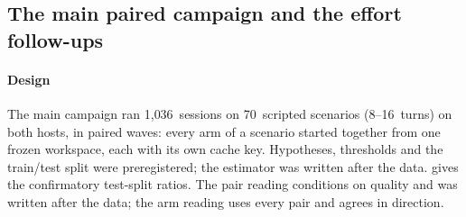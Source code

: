 \documentclass[11pt,letterpaper]{article}
\newcommand{\MaxTurns}{16}
\newcommand{\MinTurns}{8}
\newcommand{\NScenarios}{70}
\newcommand{\NSessions}{1{,}036}
\begin{document}
\subsection{The main paired campaign and the effort follow-ups}\label{sec:campaign}

\paragraph{Design} The main campaign ran \NSessions\ sessions on \NScenarios\ scripted scenarios (\MinTurns--\MaxTurns\
turns) on both hosts, in paired waves: every arm of a scenario started together from one frozen workspace, each with
its own cache key. Hypotheses, thresholds and the train/test split were preregistered; the estimator was written after
the data. \Cref{fig:forest} gives the confirmatory test-split ratios. The pair reading conditions on quality and was
written after the data; the arm reading uses every pair and agrees in direction.
\end{document}

